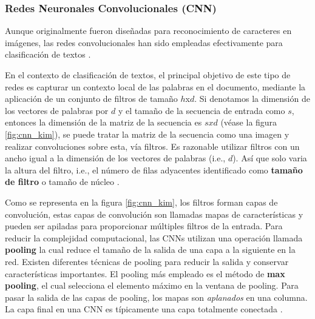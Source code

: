 \subsubsection{Redes Neuronales Convolucionales (CNN)} 

Aunque originalmente fueron diseñadas para reconocimiento de caracteres en imágenes, las redes convolucionales han sido empleadas efectivamente para clasificación de textos \citep{kim2014convolutional, zhang2015character, zhang2015sensitivity, conneau2016very}. 

En el contexto de clasificación de textos, el principal objetivo de este tipo de redes es capturar un contexto local de las palabras en el documento, mediante la aplicación de un conjunto de filtros de tamaño $h$x$d$. Si denotamos la dimensión de los vectores de palabras por $d$ y el tamaño de la secuencia de entrada como $s$, entonces la dimensión de la matriz de la secuencia es $s x d$ (véase la figura \ref{fig:cnn_kim}), se puede tratar la matriz de la secuencia como una imagen y realizar convoluciones sobre esta, vía filtros. Es razonable utilizar filtros con un ancho igual a la dimensión de los vectores de palabras (i.e., $d$). Así que solo varia la altura del filtro, i.e., el número de filas adyacentes identificado como \textbf{tamaño de filtro} o tamaño de núcleo \cite{zhang2015sensitivity}. 

Como se representa en la figura \ref{fig:cnn_kim}, los filtros forman capas de convolución, estas capas de convolución son llamadas mapas de características y pueden ser apiladas para proporcionar múltiples filtros de la entrada. Para reducir la complejidad computacional, las CNNs utilizan una operación llamada \textbf{pooling} la cual reduce el tamaño de la salida de una capa a la siguiente en la red. Existen diferentes técnicas de pooling para reducir la salida y conservar características importantes. El pooling más empleado es el método de \textbf{max pooling}, el cual selecciona el elemento máximo en la ventana de pooling. Para pasar la salida de las capas de pooling, los mapas son \textit{aplanados} en una columna. La capa final en una CNN es típicamente una capa totalmente conectada \cite{kowsari2019text}.

